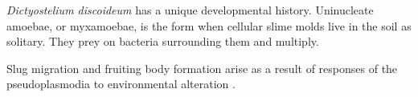 \textsl{Dictyostelium discoideum} has a unique developmental history. Uninucleate amoebae, or myxamoebae, is the form when cellular slime molds live in the soil as solitary. They prey on bacteria surrounding them and multiply.

\vspace{0.6em}\noindent
Slug migration and fruiting body formation arise as a result of responses of the pseudoplasmodia to environmental alteration \cite{newell_alternative_1969}.